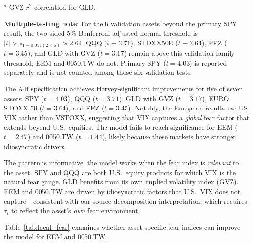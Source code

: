 \documentclass[12pt,a4paper]{article}
\begin{document}
\begin{table}[H]
\begin{threeparttable}
\begin{tablenotes}
\item $^a$ GVZ-$r^2$ correlation for GLD.
\item \textbf{Multiple-testing note}: For the 6 validation assets beyond the primary SPY result, the two-sided 5\% Bonferroni-adjusted normal threshold is $|t| > z_{1-0.05/(2\times6)} \approx 2.64$. QQQ ($t=3.71$), STOXX50E ($t=3.64$), FEZ ($t=3.45$), and GLD with GVZ ($t=3.17$) remain above this validation-family threshold; EEM and 0050.TW do not. Primary SPY ($t=4.03$) is reported separately and is not counted among those six validation tests.
\end{tablenotes}
\end{threeparttable}
\end{table}

The A4f specification achieves Harvey-significant improvements for five of seven assets: SPY ($t = 4.03$), QQQ ($t = 3.71$), GLD with GVZ ($t = 3.17$), EURO STOXX 50 ($t = 3.64$), and FEZ ($t = 3.45$). Notably, the European results use US VIX rather than VSTOXX, suggesting that VIX captures a \emph{global} fear factor that extends beyond U.S.\ equities. The model fails to reach significance for EEM ($t = 2.47$) and 0050.TW ($t = 1.44$), likely because these markets have stronger idiosyncratic drivers.

The pattern is informative: the model works when the fear index is \emph{relevant} to the asset. SPY and QQQ are both U.S.\ equity products for which VIX is the natural fear gauge. GLD benefits from its own implied volatility index (GVZ). EEM and 0050.TW are driven by idiosyncratic factors that U.S.\ VIX does not capture---consistent with our source decomposition interpretation, which requires $\tau_t$ to reflect the asset's \emph{own} fear environment.

Table~\ref{tab:local_fear} examines whether asset-specific fear indices can improve the model for EEM and 0050.TW.
\end{document}
